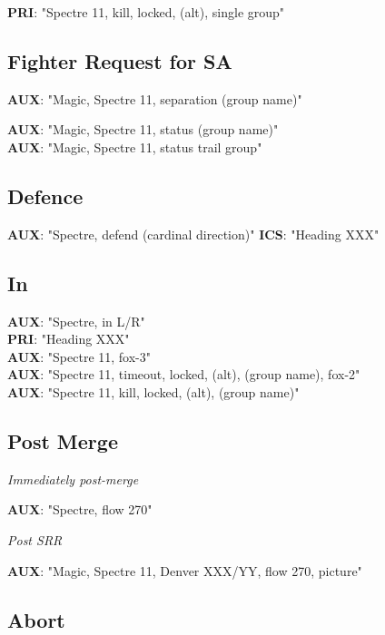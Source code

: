 \textbf{PRI}: "Spectre 11, kill, locked, (alt), single group"

\subsection*{Fighter Request for SA}

\textbf{AUX}: "Magic, Spectre 11, separation (group name)"

\textbf{AUX}: "Magic, Spectre 11, status (group name)" \\
\textbf{AUX}: "Magic, Spectre 11, status trail group"

\subsection*{Defence}

\textbf{AUX}: "Spectre, defend (cardinal direction)"
\textbf{ICS}: "Heading XXX"

\subsection*{In}

\textbf{AUX}: "Spectre, in L/R" \\
\textbf{PRI}: "Heading XXX" \\
\textbf{AUX}: "Spectre 11, fox-3"\\
\textbf{AUX}: "Spectre 11, timeout, locked, (alt), (group name), fox-2"\\
\textbf{AUX}: "Spectre 11, kill, locked, (alt), (group name)"

\subsection*{Post Merge}

\textit{Immediately post-merge}

\textbf{AUX}: "Spectre, flow 270"

\textit{Post SRR}

\textbf{AUX}: "Magic, Spectre 11, Denver XXX/YY, flow 270, picture"


\newpage

\subsection*{Abort}

